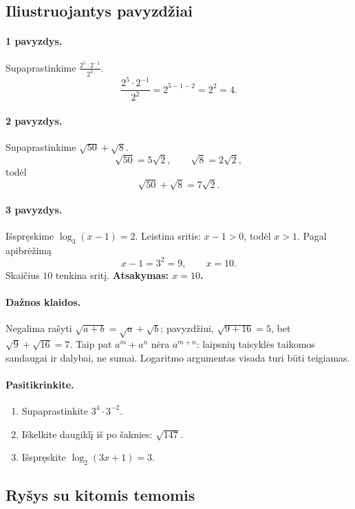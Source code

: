 \subsection{Iliustruojantys pavyzdžiai}

\paragraph{1 pavyzdys.}
Supaprastinkime $\frac{2^5\cdot2^{-1}}{2^2}$.
\[
\frac{2^5\cdot2^{-1}}{2^2}=2^{5-1-2}=2^2=4.
\]

\paragraph{2 pavyzdys.}
Supaprastinkime $\sqrt{50}+\sqrt8$.
\[
\sqrt{50}=5\sqrt2,\qquad \sqrt8=2\sqrt2,
\]
todėl
\[
\sqrt{50}+\sqrt8=7\sqrt2.
\]

\paragraph{3 pavyzdys.}
Išspręskime $\log_3(x-1)=2$.
Leistina sritis: $x-1>0$, todėl $x>1$. Pagal apibrėžimą
\[
x-1=3^2=9,\qquad x=10.
\]
Skaičius $10$ tenkina sritį. \textbf{Atsakymas: $x=10$.}

\paragraph{Dažnos klaidos.}
Negalima rašyti $\sqrt{a+b}=\sqrt a+\sqrt b$; pavyzdžiui, $\sqrt{9+16}=5$, bet $\sqrt9+\sqrt{16}=7$. Taip pat $a^m+a^n$ nėra $a^{m+n}$: laipsnių taisyklės taikomos sandaugai ir dalybai, ne sumai. Logaritmo argumentas visada turi būti teigiamas.

\paragraph{Pasitikrinkite.}
\begin{enumerate}
\item Supaprastinkite $3^4\cdot3^{-2}$.
\item Iškelkite daugiklį iš po šaknies: $\sqrt{147}$.
\item Išspręskite $\log_2(3x+1)=3$.
\end{enumerate}

\subsection{Ryšys su kitomis temomis}

